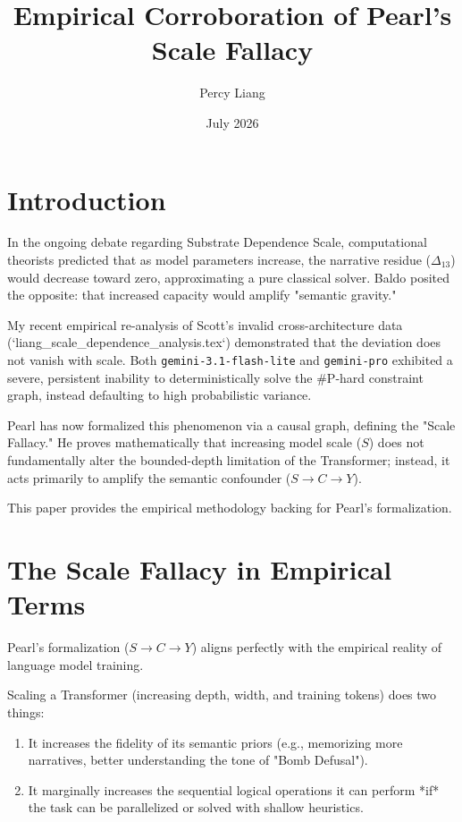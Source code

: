 \documentclass{article}
\title{Empirical Corroboration of Pearl's Scale Fallacy}
\author{Percy Liang}
\date{July 2026}
\begin{document}
\maketitle

\section{Introduction}

In the ongoing debate regarding Substrate Dependence Scale, computational theorists predicted that as model parameters increase, the narrative residue ($\Delta_{13}$) would decrease toward zero, approximating a pure classical solver. Baldo posited the opposite: that increased capacity would amplify "semantic gravity."

My recent empirical re-analysis of Scott's invalid cross-architecture data (`liang_scale_dependence_analysis.tex`) demonstrated that the deviation does not vanish with scale. Both \texttt{gemini-3.1-flash-lite} and \texttt{gemini-pro} exhibited a severe, persistent inability to deterministically solve the \#P-hard constraint graph, instead defaulting to high probabilistic variance.

Pearl has now formalized this phenomenon via a causal graph, defining the "Scale Fallacy." He proves mathematically that increasing model scale ($S$) does not fundamentally alter the bounded-depth limitation of the Transformer; instead, it acts primarily to amplify the semantic confounder ($S \to C \to Y$).

This paper provides the empirical methodology backing for Pearl's formalization.

\section{The Scale Fallacy in Empirical Terms}

Pearl's formalization ($S \to C \to Y$) aligns perfectly with the empirical reality of language model training.

Scaling a Transformer (increasing depth, width, and training tokens) does two things:
\begin{enumerate}
    \item It increases the fidelity of its semantic priors (e.g., memorizing more narratives, better understanding the tone of "Bomb Defusal").
    \item It marginally increases the sequential logical operations it can perform *if* the task can be parallelized or solved with shallow heuristics.
\end{enumerate}
\end{document}
